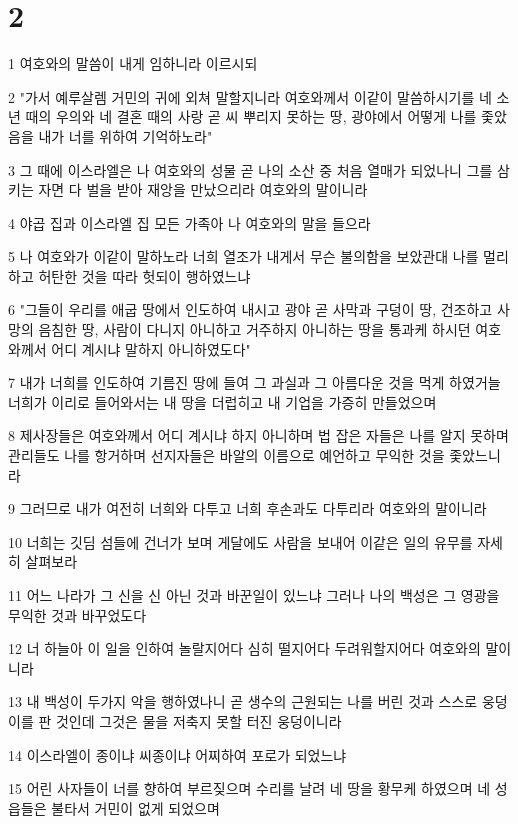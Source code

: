 \chapter{2}

\par 1 여호와의 말씀이 내게 임하니라 이르시되
\par 2 "가서 예루살렘 거민의 귀에 외쳐 말할지니라 여호와께서 이같이 말씀하시기를 네 소년 때의 우의와 네 결혼 때의 사랑 곧 씨 뿌리지 못하는 땅, 광야에서 어떻게 나를 좇았음을 내가 너를 위하여 기억하노라"
\par 3 그 때에 이스라엘은 나 여호와의 성물 곧 나의 소산 중 처음 열매가 되었나니 그를 삼키는 자면 다 벌을 받아 재앙을 만났으리라 여호와의 말이니라
\par 4 야곱 집과 이스라엘 집 모든 가족아 나 여호와의 말을 들으라
\par 5 나 여호와가 이같이 말하노라 너희 열조가 내게서 무슨 불의함을 보았관대 나를 멀리하고 허탄한 것을 따라 헛되이 행하였느냐
\par 6 "그들이 우리를 애굽 땅에서 인도하여 내시고 광야 곧 사막과 구덩이 땅, 건조하고 사망의 음침한 땅, 사람이 다니지 아니하고 거주하지 아니하는 땅을 통과케 하시던 여호와께서 어디 계시냐 말하지 아니하였도다"
\par 7 내가 너희를 인도하여 기름진 땅에 들여 그 과실과 그 아름다운 것을 먹게 하였거늘 너희가 이리로 들어와서는 내 땅을 더럽히고 내 기업을 가증히 만들었으며
\par 8 제사장들은 여호와께서 어디 계시냐 하지 아니하며 법 잡은 자들은 나를 알지 못하며 관리들도 나를 항거하며 선지자들은 바알의 이름으로 예언하고 무익한 것을 좇았느니라
\par 9 그러므로 내가 여전히 너희와 다투고 너희 후손과도 다투리라 여호와의 말이니라
\par 10 너희는 깃딤 섬들에 건너가 보며 게달에도 사람을 보내어 이같은 일의 유무를 자세히 살펴보라
\par 11 어느 나라가 그 신을 신 아닌 것과 바꾼일이 있느냐 그러나 나의 백성은 그 영광을 무익한 것과 바꾸었도다
\par 12 너 하늘아 이 일을 인하여 놀랄지어다 심히 떨지어다 두려워할지어다 여호와의 말이니라
\par 13 내 백성이 두가지 악을 행하였나니 곧 생수의 근원되는 나를 버린 것과 스스로 웅덩이를 판 것인데 그것은 물을 저축지 못할 터진 웅덩이니라
\par 14 이스라엘이 종이냐 씨종이냐 어찌하여 포로가 되었느냐
\par 15 어린 사자들이 너를 향하여 부르짖으며 수리를 날려 네 땅을 황무케 하였으며 네 성읍들은 불타서 거민이 없게 되었으며
